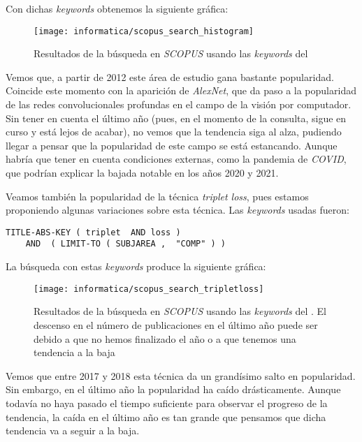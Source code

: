 Con dichas \textit{keywords} obtenemos la siguiente gráfica:

\begin{figure}[H]
    \centering
    \texttt{[image: informatica/scopus\_search\_histogram]}
    \caption{Resultados de la búsqueda en \textit{SCOPUS} usando las \textit{keywords} del }
\end{figure}

Vemos que, a partir de 2012 este área de estudio gana bastante popularidad. Coincide este momento con la aparición de \textit{AlexNet}, que da paso a la popularidad de las redes convolucionales profundas en el campo de la visión por computador. Sin tener en cuenta el último año (pues, en el momento de la consulta, sigue en curso y está lejos de acabar), no vemos que la tendencia siga al alza, pudiendo llegar a pensar que la popularidad de este campo se está estancando. Aunque habría que tener en cuenta condiciones externas, como la pandemia de \textit{COVID}, que podrían explicar la bajada notable en los años 2020 y 2021.

Veamos también la popularidad de la técnica \textit{triplet loss}, pues estamos proponiendo algunas variaciones sobre esta técnica. Las \textit{keywords} usadas fueron:

\begin{lstlisting}[caption=\textit{Keywords usadas para la búsqueda en \textit{SCOPUS} para consultar la popularidad del \textit{triplet loss}. Búsqueda realizada el 17 de Septiembre de 2023}, label=code:scopus_search_tripletloss, captionpos=b]
    TITLE-ABS-KEY ( triplet  AND loss )
    AND  ( LIMIT-TO ( SUBJAREA ,  "COMP" ) )
\end{lstlisting}

La búsqueda con estas \textit{keywords} produce la siguiente gráfica:

\begin{figure}[H]
    \centering
    \texttt{[image: informatica/scopus\_search\_tripletloss]}
    \caption{Resultados de la búsqueda en \textit{SCOPUS} usando las \textit{keywords} del . El descenso en el número de publicaciones en el último año puede ser debido a que no hemos finalizado el año o a que tenemos una tendencia a la baja}
\end{figure}

Vemos que entre 2017 y 2018 esta técnica da un grandísimo salto en popularidad. Sin embargo, en el último año la popularidad ha caído drásticamente. Aunque todavía no haya pasado el tiempo suficiente para observar el progreso de la tendencia, la caída en el último año es tan grande que pensamos que dicha tendencia va a seguir a la baja.

